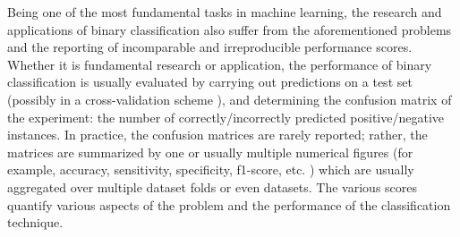 \documentclass[5p, final]{elsarticle}
\begin{document}
Being one of the most fundamental tasks in machine learning, the research and applications of binary classification \cite{1} also suffer from the aforementioned problems and the reporting of incomparable and irreproducible performance scores. Whether it is fundamental research or application, the performance of binary classification is usually evaluated by carrying out predictions on a test set (possibly in a cross-validation scheme \cite{cv1}), and determining the confusion matrix \cite{scores} of the experiment: the number of correctly/incorrectly predicted positive/negative instances. In practice, the confusion matrices are rarely reported; rather, the matrices are summarized by one or usually multiple numerical figures (for example, accuracy, sensitivity, specificity, f1-score, etc. \cite{scores}) which are usually aggregated over multiple dataset folds or even datasets. The various scores quantify various aspects of the problem and the performance of the classification technique.
\end{document}
